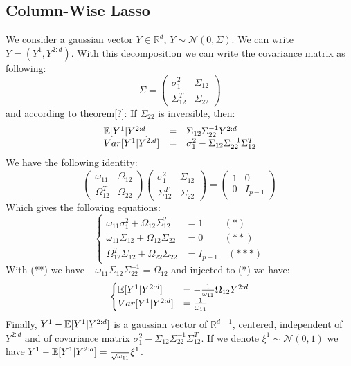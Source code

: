 \documentclass[12pt]{article}
\let\bb\mathbb       %
\def\RR{{\bb R}}\def\ZZ{{\bb Z}}\def\FF{{\bb F}}\def\DD{{\bb D}}
\def\bb{\mathbb}
\begin{document}
\subsection{Column-Wise Lasso}

We consider a gaussian vector $Y\in \RR^d$, $Y \sim \mathcal N(0,\Sigma)$. We can write $Y=(Y^1,Y^{2:d})$. With this decomposition we can write the covariance matrix as following:
\begin{equation}
\Sigma=
 \begin{pmatrix}
\sigma_1^2 & \Sigma_{12}\\
\Sigma_{12}^T & \Sigma_{22}
\end{pmatrix}
\end{equation}
and according to theorem[?]: If $\Sigma_{22}$ is inversible, then:
\begin{equation}
\begin{array}{lcl}
\EE[Y^1|Y^{2:d}]&=&\Sigma_{12}\Sigma_{22}^{-1}Y^{2:d}\\
Var[Y^1|Y^{2:d}]&=&\sigma_1^2-\Sigma_{12}\Sigma_{22}^{-1}\Sigma_{12}^T
\end{array}
\end{equation}
We have the following identity:
\begin{equation}
 \begin{pmatrix}
 \omega_{11}&\Omega_{12}\\
 \Omega_{12}^T&\Omega_{22}
\end{pmatrix}
 \begin{pmatrix}
 \sigma_{1}^2&\Sigma_{12}\\
 \Sigma_{12}^T&\Sigma_{22}
\end{pmatrix}
=
 \begin{pmatrix}
 1&0\\
0&I_{p-1}
\end{pmatrix}
\end{equation}
Which gives the following equations:
\begin{equation}
  \begin{cases}
  \omega_{11}\sigma_1^2+\Omega_{12}\Sigma_{12}^T&=1\quad\,\quad(*) \\
  \omega_{11}\Sigma_{12}+\Omega_{12}\Sigma_{22}&=0\quad\,\quad(**)\\
  \Omega_{12}^T\Sigma_{12}+\Omega_{22}\Sigma_{22}&=I_{p-1}\quad(***)
  \end{cases}
\end{equation}
With (**) we have $-\omega_{11}\Sigma_{12}\Sigma_{22}^{-1}=\Omega_{12}$ and injected to (*) we have:
\begin{equation}
 \begin{cases}
 \EE[Y^1|Y^{2:d}]&=-\frac{1}{\omega_{11}}\Omega_{12}Y^{2:d}\\
  Var[Y^1|Y^{2:d}]&=\frac{1}{\omega_{11}}
  \end{cases}
\end{equation}
Finally, $Y^1-\EE[Y^1|Y^{2:d}]$ is a gaussian vector of $\RR^{d-1}$, centered, independent of $Y^{2:d}$ and of covariance matrix $\sigma_1^2-\Sigma_{12}\Sigma_{22}^{-1}\Sigma_{12}^T$. If we denote  $\xi^1\sim \mathcal N(0,1)$ we have $Y^1-\EE[Y^1|Y^{2:d}]=\frac{1}{ \sqrt{\omega_{11}}}\xi^1$.\\
\end{document}
